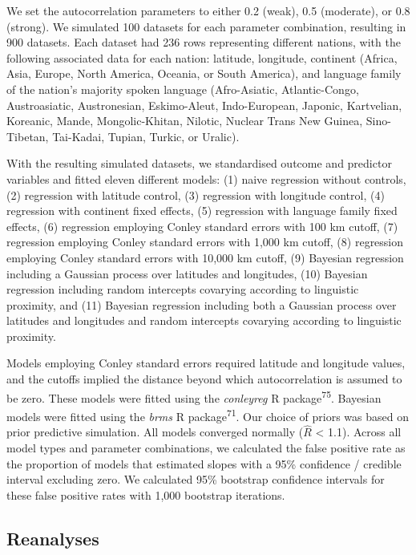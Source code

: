 \documentclass[
  man,floatsintext]{apa6}
\begin{document}
We set the autocorrelation parameters to either 0.2 (weak), 0.5 (moderate), or 0.8 (strong). We simulated 100 datasets for each parameter combination, resulting in 900 datasets. Each dataset had 236 rows representing different nations, with the following associated data for each nation: latitude, longitude, continent (Africa, Asia, Europe, North America, Oceania, or South America), and language family of the nation's majority spoken language (Afro-Asiatic, Atlantic-Congo, Austroasiatic, Austronesian, Eskimo-Aleut, Indo-European, Japonic, Kartvelian, Koreanic, Mande, Mongolic-Khitan, Nilotic, Nuclear Trans New Guinea, Sino-Tibetan, Tai-Kadai, Tupian, Turkic, or Uralic).

With the resulting simulated datasets, we standardised outcome and predictor variables and fitted eleven different models: (1) naive regression without controls, (2) regression with latitude control, (3) regression with longitude control, (4) regression with continent fixed effects, (5) regression with language family fixed effects, (6) regression employing Conley standard errors with 100 km cutoff, (7) regression employing Conley standard errors with 1,000 km cutoff, (8) regression employing Conley standard errors with 10,000 km cutoff, (9) Bayesian regression including a Gaussian process over latitudes and longitudes, (10) Bayesian regression including random intercepts covarying according to linguistic proximity, and (11) Bayesian regression including both a Gaussian process over latitudes and longitudes and random intercepts covarying according to linguistic proximity.

Models employing Conley standard errors required latitude and longitude values, and the cutoffs implied the distance beyond which autocorrelation is assumed to be zero. These models were fitted using the \emph{conleyreg} R package\textsuperscript{75}. Bayesian models were fitted using the \emph{brms} R package\textsuperscript{71}. Our choice of priors was based on prior predictive simulation. All models converged normally (\(\hat{R}\) \textless{} 1.1). Across all model types and parameter combinations, we calculated the false positive rate as the proportion of models that estimated slopes with a 95\% confidence / credible interval excluding zero. We calculated 95\% bootstrap confidence intervals for these false positive rates with 1,000 bootstrap iterations.

\hypertarget{reanalyses}{%
\subsection{Reanalyses}\label{reanalyses}}
\end{document}
